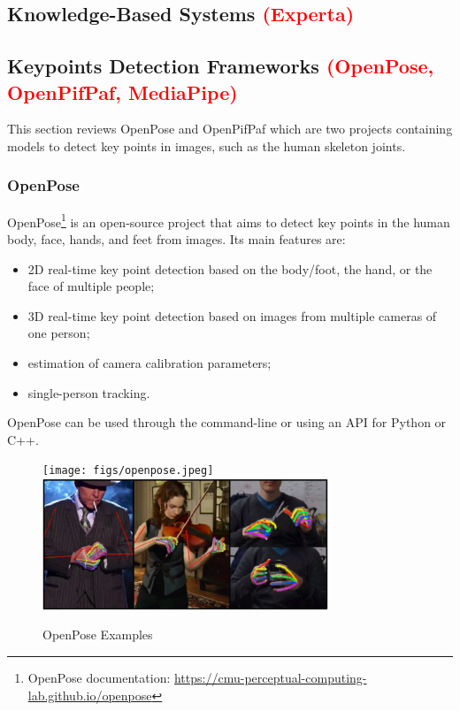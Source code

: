 \subsection{Knowledge-Based Systems \textcolor{red}{(Experta)}}

\subsection{Keypoints Detection Frameworks \textcolor{red}{(OpenPose, OpenPifPaf, MediaPipe)}}
\label{subsection:keypointdetection}

This section reviews OpenPose and OpenPifPaf which are two projects containing models to detect key points in images, such as the human skeleton joints.

\subsubsection{OpenPose}

OpenPose\cite{Cao2021,Simon2017,Cao2018,Wei2016}\footnote{OpenPose documentation: \url{https://cmu-perceptual-computing-lab.github.io/openpose}} is an open-source project that aims to detect key points in the human body, face, hands, and feet from images. Its main features are:

\begin{itemize}
    \item 2D real-time key point detection based on the body/foot, the hand, or the face of multiple people;
    \item 3D real-time key point detection based on images from multiple cameras of one person;
    \item estimation of camera calibration parameters;
    \item single-person tracking.
\end{itemize}

OpenPose can be used through the command-line or using an API for Python or C++.

\begin{figure}[h]
\centerline{\texttt{[image: figs/openpose.jpeg]}\includegraphics[height=1.55in]{figs/openpose2.PNG}}
\caption[OpenPose Examples]{OpenPose Examples \cite{Cao2021,Simon2017}}
\label{openpose}
\end{figure}

